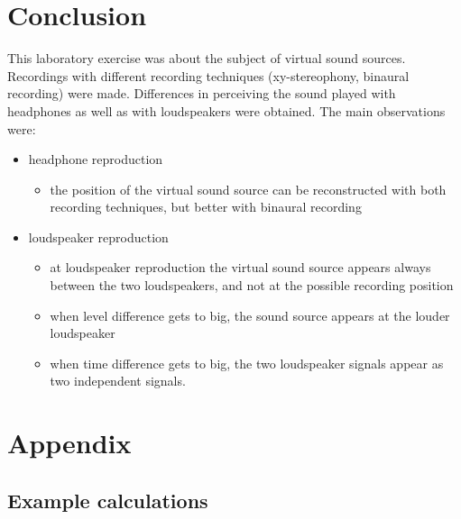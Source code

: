 \documentclass{article}
\begin{document}
\newpage
\section{Conclusion}
This laboratory exercise was about the subject of virtual sound sources. Recordings with different recording techniques (xy-stereophony, binaural recording) were made. Differences in perceiving the sound played with headphones as well as with loudspeakers were obtained. The main observations were:
\begin{itemize}
\item headphone reproduction
\begin{itemize}
\item the position of the virtual sound source can be reconstructed with both recording techniques, but better with binaural recording
\end{itemize}
\item loudspeaker reproduction
\begin{itemize}
\item at loudspeaker reproduction the virtual sound source appears always between the two loudspeakers, and not at the possible recording position
\item when level difference gets to big, the sound source appears at the louder loudspeaker
\item when time difference gets to big, the two loudspeaker signals appear as two independent signals.
\end{itemize}
\end{itemize}
\newpage
\section{Appendix}
\subsection{Example calculations}
\end{document}
